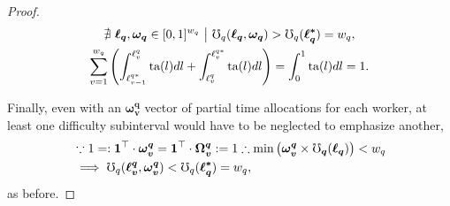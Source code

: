 \documentclass[hidelinks, nonatbib]{elsarticle}
\begin{document}
\begin{lemma}
\begin{proof}
\begin{gather}
            \nexists \
            \boldsymbol{\ell_q}
            ,
            \boldsymbol{\omega_q}
            \in
            [0,1]^{w_q}
            \
            \big|
            \
            \mho_{q}(
                \boldsymbol{\ell_q}
                ,\boldsymbol{\omega_q}
            ) 
            >
            \mho_{q}(
                \boldsymbol{\ell_{q}^{*}}
            )
            =
            w_q
            ,
            \\
            \sum_{v=1}^{w_q}
            \left(
                \int_{
                    \ell_{v-1}^{q*}
                }^{
                    \ell_{v}^{q}
                }
                \text{ta}(l)dl
                +
                \int_{
                    \ell_{v}^{q}
                }^{
                    \ell_{v}^{q*}
                }
                \text{ta}(l)dl
            \right)
            =
            \int_{0}^{1}
            \text{ta}(l)dl
            =
            1
            .
        \end{gather}
        
        Finally, even with an $\boldsymbol{\omega_{v}^{q}}$ vector of partial time allocations for each worker, at least one difficulty subinterval would have to be neglected to emphasize another,
        \begin{align}
            &
            \because
            1 =:
            \boldsymbol{1} ^ \top
            \cdot
            \boldsymbol{\omega_{v}^{q}}
            =
            \boldsymbol{1} ^ \top
            \cdot
            \boldsymbol{\Omega_{v}^{q}}
            := 1
            \therefore
            \min\left(
                \boldsymbol{\omega_{v}^{q}}
                \times
                \boldsymbol{\mho_q}(
                    \boldsymbol{\ell_{q}}
                )
            \right)
            <
            w_q
            \\
            &
            \implies
            \mho_q(
                \boldsymbol{\ell_{v}^{q}},
                \boldsymbol{\omega_{v}^{q}}
            )
            <
            \mho_q(
                \boldsymbol{\ell_{q}^{*}}
            )
            =
            w_q
            ,
        \end{align}
        as before.
        

\end{proof}
\end{lemma}
\end{document}
